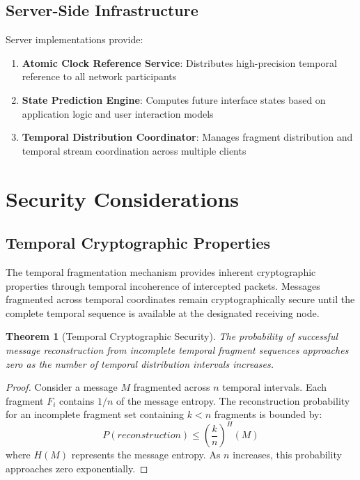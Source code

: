 \documentclass[12pt,a4paper]{article}
\newtheorem{theorem}{Theorem}
\begin{document}
\subsection{Server-Side Infrastructure}

Server implementations provide:

\begin{enumerate}
\item \textbf{Atomic Clock Reference Service}: Distributes high-precision temporal reference to all network participants
\item \textbf{State Prediction Engine}: Computes future interface states based on application logic and user interaction models
\item \textbf{Temporal Distribution Coordinator}: Manages fragment distribution and temporal stream coordination across multiple clients
\end{enumerate}

\section{Security Considerations}

\subsection{Temporal Cryptographic Properties}

The temporal fragmentation mechanism provides inherent cryptographic properties through temporal incoherence of intercepted packets. Messages fragmented across temporal coordinates remain cryptographically secure until the complete temporal sequence is available at the designated receiving node.

\begin{theorem}[Temporal Cryptographic Security]
The probability of successful message reconstruction from incomplete temporal fragment sequences approaches zero as the number of temporal distribution intervals increases.
\end{theorem}

\begin{proof}
Consider a message $M$ fragmented across $n$ temporal intervals. Each fragment $F_i$ contains $1/n$ of the message entropy. The reconstruction probability for an incomplete fragment set containing $k < n$ fragments is bounded by:
\begin{equation}
P(reconstruction) \leq \left(\frac{k}{n}\right)^H(M)
\end{equation}
where $H(M)$ represents the message entropy. As $n$ increases, this probability approaches zero exponentially.
\end{proof}
\end{document}
